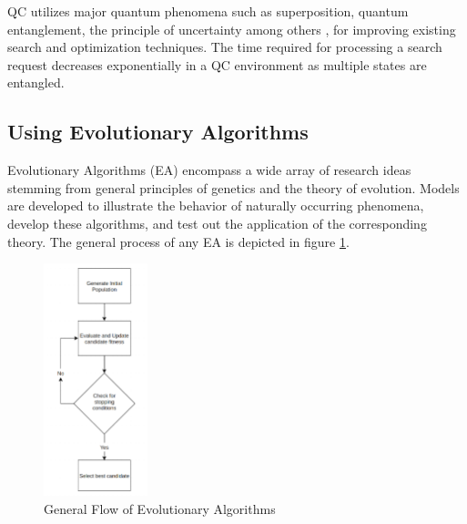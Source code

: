\documentclass[conference]{IEEEtran}
\begin{document}
QC utilizes major quantum phenomena such as superposition, quantum entanglement, the principle of uncertainty among others \cite{az}, for improving existing search and optimization techniques. The time required for processing a search request decreases exponentially in a QC environment as multiple states are entangled.  

\subsection{Using Evolutionary Algorithms}

Evolutionary Algorithms (EA) \cite{vik} encompass a wide array of research ideas stemming from general principles of genetics and the theory of evolution. Models are developed to illustrate the behavior of naturally occurring phenomena, develop these algorithms, and test out the application of the corresponding theory. The general process of any EA is depicted in figure \ref{p1}. 

\begin{figure}[!t]
\centering\includegraphics[height=6.75cm]{p1.png}
\caption{General Flow of Evolutionary Algorithms}
\label{p1}
\end{figure}
\end{document}
